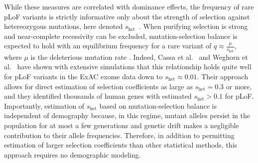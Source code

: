 \documentclass[11pt]{article}
\begin{document}
While these measures are correlated with dominance effects, the frequency of rare pLoF variants is strictly informative only about the strength of selection against hetereozygous mutations, here denoted $s_{\text{het}}$~\cite{FULLETAL19}.  When purifying selection is strong and near-complete recessivity can be excluded, mutation-selection balance is expected to hold with an equilibrium frequency for a rare variant of $q \approx \frac{\mu}{s_{\text{het}}}$, where $\mu$ is the deleterious mutation rate \cite{HALD37,FULLETAL19}.  Indeed, Cassa et al.\ \cite{CASSETAL17} and Weghorn et al.\ \cite{WEGHETAL19} have shown with extensive simulations that this relationship holds quite well for pLoF variants in the ExAC exome data \cite{LEKETAL16} down to $s_{\text{het}} \approx 0.01$.  Their approach allows for direct estimation of selection coefficients as large as $s_{\text{het}} =0.3$ or more, and they identified thousands of human genes with estimated $s_{\text{het}} >0.1$ for pLoF.
Importantly,  estimation of $s_{\text{het}}$ based on mutation-selection balance
is independent of demography because, in this regime, mutant alleles persist in the population for at most a few generations and genetic drift makes a negligible contribution to their allele frequencies.
Therefore, in addition to permitting estimation of larger selection coefficients than other statistical methods, this approach requires no demographic modeling.


\end{document}
